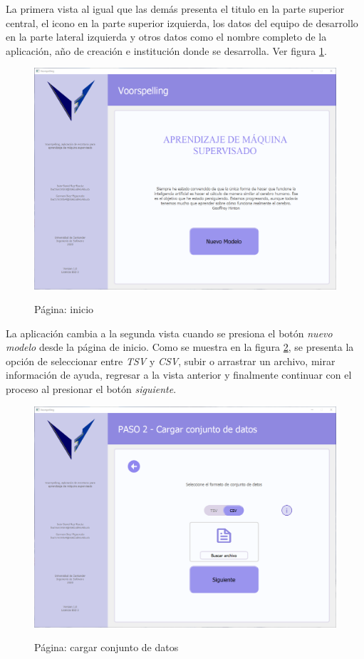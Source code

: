 La primera vista al igual que las demás presenta el titulo en la parte superior central, el icono en la parte superior izquierda, los datos del equipo de desarrollo en la parte lateral izquierda y otros datos como el nombre completo de la aplicación, año de creación e institución donde se desarrolla. Ver figura \ref{fig:home}.

\begin{figure}[H]
    \centering
    \caption{Página: inicio}
    \includegraphics[width=\textwidth]{images/home.png}
    \label{fig:home}
\end{figure}

La aplicación cambia a la segunda vista cuando se presiona el botón \textit{nuevo modelo} desde la página de inicio. Como se muestra en la figura \ref{fig:loaddataset}, se presenta la opción de seleccionar entre \textit{TSV} y \textit{CSV}, subir o arrastrar un archivo, mirar información de ayuda, regresar a la vista anterior y finalmente continuar con el proceso al presionar el botón \textit{siguiente}.

\begin{figure}[H]
    \centering
    \caption{Página: cargar conjunto de datos}
    \includegraphics[width=\textwidth]{images/loaddataset.png}
    \label{fig:loaddataset}
\end{figure}

